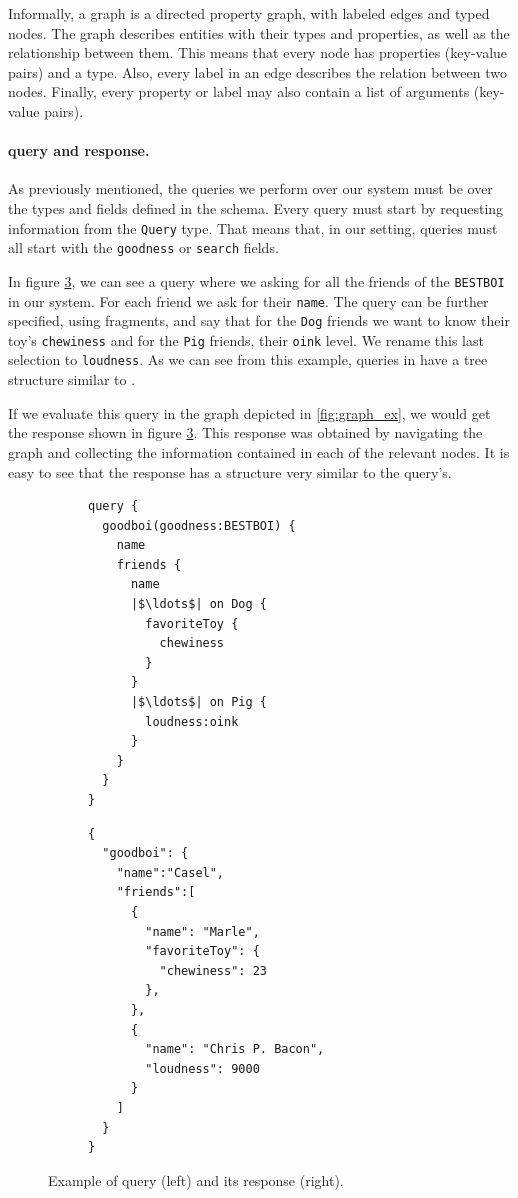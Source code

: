 Informally, a \gql graph is a directed property graph, with labeled edges and typed nodes. The graph describes entities with their types and properties, as well as the relationship between them. This means that every node has properties (key-value pairs) and a type. Also, every label in an edge describes the relation between two nodes. Finally, every property or label may also contain a list of arguments (key-value pairs).


\paragraph{\gql query and response.}

As previously mentioned, the queries we perform over our system must be over the types and fields defined in the schema. Every query must start by requesting information from the \texttt{Query} type. That means that, in our setting, queries must all start with the \texttt{goodness} or \texttt{search} fields.

In figure \ref{fig:qres_ex}, we can see a query where we asking for all the friends of the \texttt{BESTBOI} in our system. For each friend we ask for their \texttt{name}. The query can be further specified, using fragments, and say that for the \texttt{Dog} friends we want to know their toy's \texttt{chewiness} and for the \texttt{Pig} friends, their \texttt{oink} level. We rename this last selection to \texttt{loudness}. As we can see from this example, queries in \gql have a tree structure similar to \json.

If we evaluate this query in the graph depicted in \ref{fig:graph_ex}, we would get the response shown in figure \ref{fig:qres_ex}. This response was obtained by navigating the graph and collecting the information contained in each of the relevant nodes. It is easy to see that the response has a structure very similar to the query's.


\begin{figure}
\centering
\begin{subfigure}{.25\textwidth}
\begin{verbatim}
query {
  goodboi(goodness:BESTBOI) {
    name
    friends {
      name
      |$\ldots$| on Dog {
        favoriteToy {
          chewiness
        }
      }
      |$\ldots$| on Pig {
        loudness:oink
      }
    }
  }
}
\end{verbatim}
\label{fig:query_ex}
\end{subfigure}%
\begin{subfigure}{.25\textwidth}
\begin{verbatim}
{
  "goodboi": {
    "name":"Casel",
    "friends":[
      {
        "name": "Marle",
        "favoriteToy": {
          "chewiness": 23
        },
      },
      {
        "name": "Chris P. Bacon",
        "loudness": 9000
      }
    ]
  }
}
\end{verbatim}
\label{fig:response_ex}
\end{subfigure}

\caption{Example of \gql query (left) and its response (right).}
\label{fig:qres_ex}
\end{figure}

